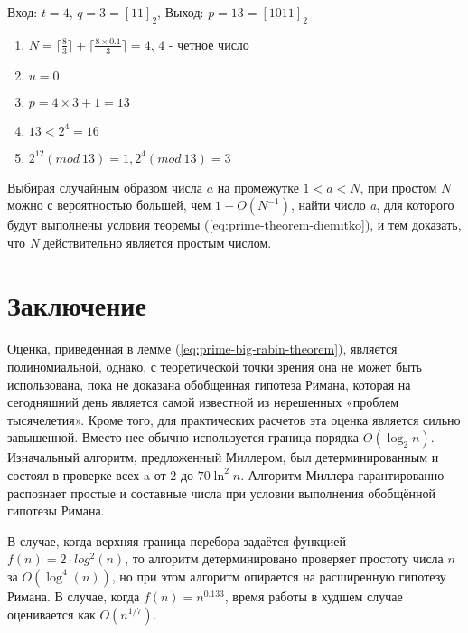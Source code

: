       \begin{example} 
	     Вход: {$t = 4$}, {$q = 3 = [11]_{2}$}, Выход: {$p = 13 = [1011]_{2}$}
	
	  \begin{enumerate}
	   \item {$N = \lceil \frac{8}{3} \rceil + \lceil \frac{8 \times 0.1}{3} \rceil = 4$}, {$4$} - четное число
	   \item {$u = 0$}
	   \item {$p = 4 \times 3 + 1 = 13$}
	   \item {$13 < 2^{ 4} = 16$}
	   \item {$2^{ 12}(mod \: 13) = 1, 2^{ 4}(mod \: 13) = 3$}
	  \end{enumerate}  
	
      \end{example}

  Выбирая случайным образом числа {$a$} на промежутке {$1 < a < N$}, при простом {$N$}  
  можно с вероятностью большей, чем {$1 - O(N^{ -1})$}, найти число \textit{a}, для которого будут выполнены условия 
  теоремы (\ref{eq:prime-theorem-diemitko}), и тем доказать, что \textit{N} действительно является простым числом.

\section{Заключение}

\paragraph{} Оценка, приведенная в лемме (\ref{eq:prime-big-rabin-theorem}), является полиномиальной, однако, с теоретической точки зрения она не может быть использована, пока не доказана обобщенная гипотеза Римана, которая на сегодняшний день является самой известной из нерешенных «проблем тысячелетия». Кроме того, для практических расчетов эта оценка является сильно завышенной. Вместо нее обычно используется граница порядка $O(\log_{2}{n})$. Изначальный алгоритм, предложенный Миллером, был детерминированным и состоял в проверке всех a от $2$ до $70 \ln^{2}n$. Алгоритм Миллера гарантированно распознает простые и составные числа при условии выполнения обобщённой гипотезы Римана. 

  В случае, когда верхняя граница перебора задаётся функцией $f(n)=2 \cdot log^{2}(n)$, то алгоритм детерминировано проверяет простоту числа $n$ за
$O(\log^{4}(n))$, но при этом алгоритм опирается на расширенную гипотезу Римана. В случае, когда $f(n)=n^{0.133}$, время работы в худшем случае оценивается как $O(n^{1/7})$.

